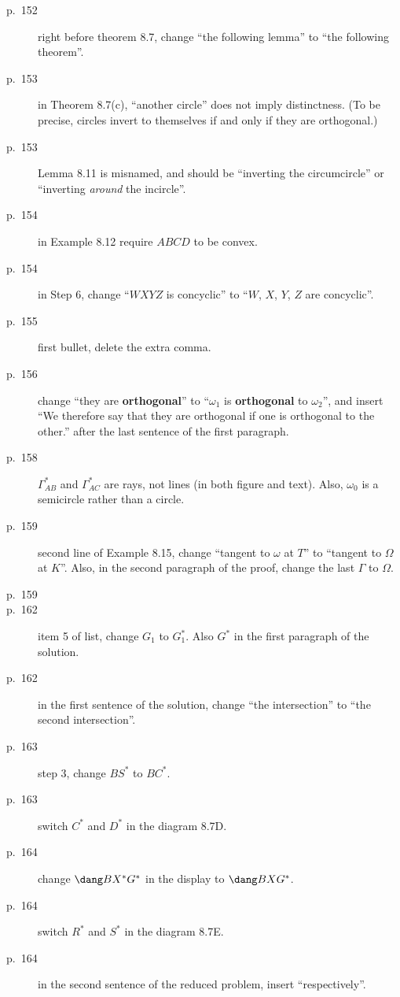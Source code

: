\documentclass[11pt]{scrartcl}
\begin{document}
\begin{description}
\item[p.\  152] right before theorem 8.7,
  change ``the following lemma'' to ``the following theorem''.
\item[p.\  153] in Theorem 8.7(c), ``another circle'' does not imply distinctness.
  (To be precise, circles invert to themselves if and only if they are orthogonal.)
\item[p.\  153] Lemma 8.11 is misnamed, and should be ``inverting the circumcircle''
  or ``inverting \emph{around} the incircle''.
\item[p.\  154] in Example 8.12 require $ABCD$ to be convex.
\item[p.\  154] in Step 6, change ``$WXYZ$ is concyclic'' to ``$W$, $X$, $Y$, $Z$ are concyclic''.
\item[p.\  155] first bullet, delete the extra comma.
\item[p.\  156] change ``they are \textbf{orthogonal}'' to ``$\omega_1$ is \textbf{orthogonal} to $\omega_2$'',
  and insert ``We therefore say that they are orthogonal if one is orthogonal to the other.'' after the last sentence of the first paragraph.
\item[p.\  158] $\Gamma_{AB}^\ast$ and $\Gamma_{AC}^\ast$ are rays, not lines (in both figure and text).
  Also, $\omega_0$ is a semicircle rather than a circle.
\item[p.\  159] second line of Example 8.15,
  change ``tangent to $\omega$ at $T$'' to ``tangent to $\Omega$ at $K$''.
  Also, in the second paragraph of the proof, change the last $\Gamma$ to $\Omega$.
\item[p.\  159] 
\item[p.\  162] item 5 of list, change $G_1$ to $G_1^\ast$.
  Also $G^\ast$ in the first paragraph of the solution.
\item[p.\  162] in the first sentence of the solution,
  change ``the intersection'' to ``the second intersection''.
\item[p.\  163] step 3, change $BS^\ast$ to $BC^\ast$.
\item[p.\  163] switch $C^\ast$ and $D^\ast$ in the diagram 8.7D.
\item[p.\  164] change $\dang BX^\ast G^\ast$ in the display to $\dang BXG^\ast$.
\item[p.\  164] switch $R^\ast$ and $S^\ast$ in the diagram 8.7E.
\item[p.\  164] in the second sentence of the reduced problem, insert ``respectively''.

\end{description}
\end{document}
